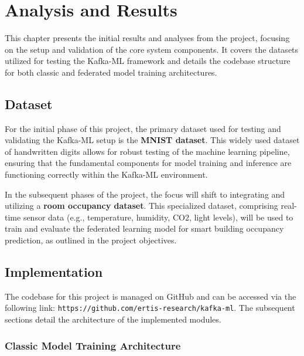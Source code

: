 \chapter{Analysis and Results}

\label{chap:results_analyses}

This chapter presents the initial results and analyses from the project, focusing on the setup and validation of the core system components. It covers the datasets utilized for testing the Kafka-ML framework and details the codebase structure for both classic and federated model training architectures.



\section{Dataset}
\label{sec:dataset}

For the initial phase of this project, the primary dataset used for testing and validating the Kafka-ML setup is the \textbf{MNIST dataset}. This widely used dataset of handwritten digits allows for robust testing of the machine learning pipeline, ensuring that the fundamental components for model training and inference are functioning correctly within the Kafka-ML environment.

In the subsequent phases of the project, the focus will shift to integrating and utilizing a \textbf{room occupancy dataset}. This specialized dataset, comprising real-time sensor data (e.g., temperature, humidity, CO2, light levels), will be used to train and evaluate the federated learning model for smart building occupancy prediction, as outlined in the project objectives.



\section{Implementation}
\label{sec:code}

The codebase for this project is managed on GitHub and can be accessed via the following link: \texttt{https://github.com/ertis-research/kafka-ml}. The subsequent sections detail the architecture of the implemented modules.

\subsection{Classic Model Training Architecture}
\label{subsec:classic_model_training}

